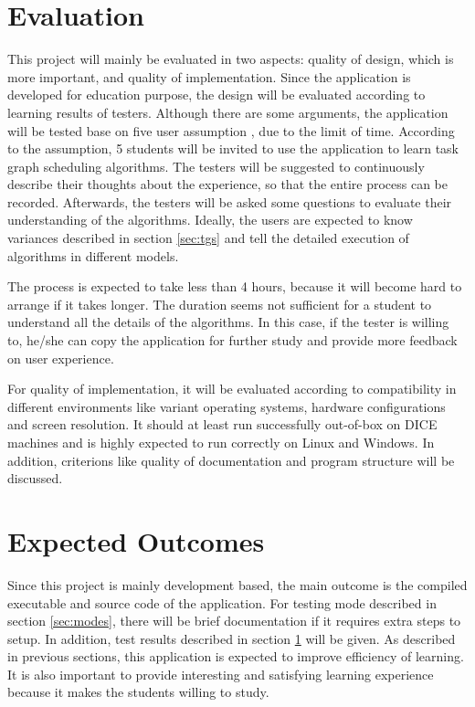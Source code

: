 \documentclass[a4paper,11pt]{article}
\begin{document}
\section{Evaluation} \label{sec:eva}

This project will mainly be evaluated in two aspects: quality of design, which is more important, and quality of implementation. Since the application is developed for education purpose, the design will be evaluated according to learning results of testers. Although there are some arguments, the application will be tested base on five user assumption \cite{Virzi1992}, due to the limit of time. According to the assumption, 5 students will be invited to use the application to learn task graph scheduling algorithms. The testers will be suggested to continuously describe their thoughts about the experience, so that the entire process can be recorded. Afterwards, the testers will be asked some questions to evaluate their understanding of the algorithms. Ideally, the users are expected to know variances described in section \ref{sec:tgs} and tell the detailed execution of algorithms in different models.

The process is expected to take less than 4 hours, because it will become hard to arrange if it takes longer. The duration seems not sufficient for a student to understand all the details of the algorithms. In this case, if the tester is willing to, he/she can copy the application for further study and provide more feedback on user experience.

For quality of implementation, it will be evaluated according to compatibility in different environments like variant operating systems, hardware configurations and screen resolution. It should at least run successfully out-of-box on DICE machines and is highly expected to run correctly on Linux and Windows. In addition, criterions like quality of documentation and program structure will be discussed.

\section{Expected Outcomes}

Since this project is mainly development based, the main outcome is the compiled executable and source code of the application. For testing mode described in section \ref{sec:modes}, there will be brief documentation if it requires extra steps to setup. In addition, test results described in section \ref{sec:eva} will be given. As described in previous sections, this application is expected to improve efficiency of learning. It is also important to provide interesting and satisfying learning experience because it makes the students willing to study.
\end{document}
